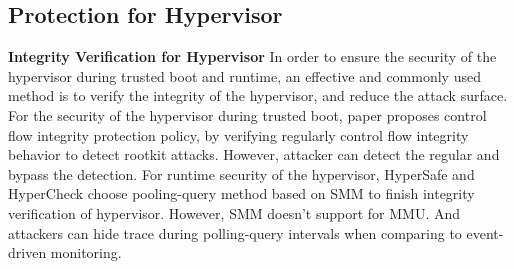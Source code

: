 \documentclass[conference]{IEEEtran}
\begin{document}
\subsection{Protection for Hypervisor}
\textbf{Integrity Verification for Hypervisor}
In order to ensure the security of the hypervisor during trusted boot and runtime, an effective and commonly used method is to verify the integrity of the hypervisor, and reduce the attack surface. For the security of the hypervisor during trusted boot, paper \cite{Petroni2007Automated} proposes control flow integrity protection policy, by verifying regularly control flow integrity behavior to detect rootkit attacks. However, attacker can detect the regular and bypass the detection. For runtime security of the hypervisor, HyperSafe \cite{Wang2010HyperSafe} and HyperCheck \cite{Wang2010HyperCheck} choose pooling-query method based on SMM to finish integrity verification of hypervisor. However, SMM doesn't support for MMU. And attackers can hide trace during polling-query intervals when comparing to event-driven monitoring.
\end{document}
